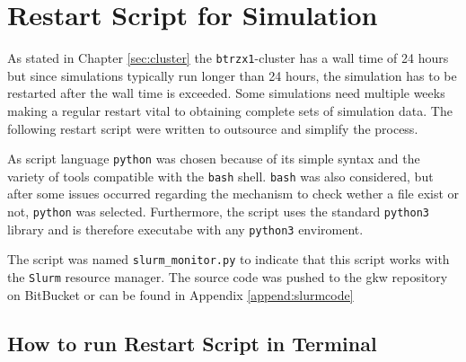 \section{Restart Script for Simulation}
\label{sec:restartscript}

As stated in Chapter \ref{sec:cluster} the \texttt{btrzx1}-cluster has a wall time of 24 hours but since simulations typically run longer than 24 hours, the simulation has to be restarted after the wall time is exceeded. Some simulations need multiple weeks making a regular restart vital to obtaining complete sets of simulation data. The following restart script were written to outsource and simplify the process.

As script language \texttt{python} was chosen because of its simple syntax and the variety of tools compatible with the \texttt{bash} shell. \texttt{bash} was also considered, but after some issues occurred regarding the mechanism to check wether a file exist or not, \texttt{python} was selected. Furthermore, the script uses the standard \texttt{python3} library and is therefore executabe with any \texttt{python3} enviroment.

The script was named \texttt{slurm\_monitor.py} to indicate that this script works with the \texttt{Slurm} resource manager. The source code was pushed to the gkw repository on BitBucket \cite{slurmmonitor} or can be found in Appendix \ref{append:slurmcode}

\subsection{How to run Restart Script in Terminal}
\label{sub:codeRun}

